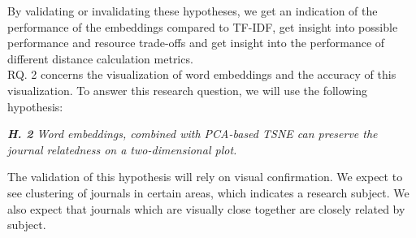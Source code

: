 \documentclass[../../Thesis.tex]{subfiles}
\begin{document}
By validating or invalidating these hypotheses, we get an indication of the performance of the embeddings compared to TF-IDF,  get insight into possible performance and resource trade-offs and get insight into the performance of different distance calculation metrics.\\ 
RQ. 2 concerns the visualization of word embeddings and the accuracy of this visualization. To answer this research question, we will use the following hypothesis:
\begin{jumpin}
\textit{\textbf{H. 2} Word embeddings, combined with PCA-based TSNE can preserve the journal relatedness on a two-dimensional plot.}
\end{jumpin}
The validation of this hypothesis will rely on visual confirmation. We expect to see clustering of journals in certain areas, which indicates a research subject. We also expect that journals which are visually close together are closely related by subject. 
\end{document}
